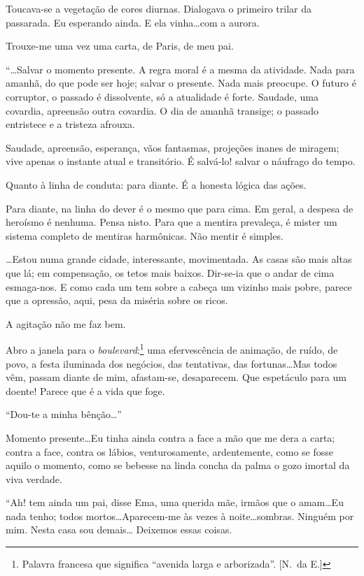 Toucava{}-se a vegetação de cores diurnas. Dialogava o primeiro trilar da passarada.
Eu esperando ainda. E ela vinha\ldots com a aurora. 

Trouxe{}-me uma vez uma carta, de Paris, de meu pai. 

``\ldots Salvar o momento presente. A regra moral é a
mesma da atividade. Nada para amanhã, do que pode ser hoje; salvar o
presente. Nada mais preocupe. O futuro é corruptor, o passado é
dissolvente, só a atualidade é forte. Saudade, uma covardia, apreensão
outra covardia. O dia de amanhã transige; o passado entristece e a
tristeza afrouxa. 

Saudade, apreensão, esperança, vãos fantasmas,
projeções inanes de miragem; vive apenas o instante atual e
transitório. É salvá{}-lo! salvar o náufrago do tempo. 

Quanto à linha de conduta: para diante. É a honesta lógica das ações. 

Para diante, na
linha do dever é o mesmo que para cima. Em geral, a despesa de heroísmo
é nenhuma. Pensa nisto. Para que a mentira prevaleça, é mister um
sistema completo de mentiras harmônicas. Não mentir é simples. 

\ldots Estou numa grande cidade, interessante, movimentada. As casas são mais 
altas que lá; em compensação, os tetos mais baixos. Dir{}-se{}-ia que o andar
de cima esmaga{}-nos. E como cada um tem sobre a cabeça um vizinho mais
pobre, parece que a opressão, aqui, pesa da miséria sobre os ricos. 

A agitação não me faz bem. 

Abro a janela para o \textit{boulevard}:\footnote{ Palavra francesa que significa 
``avenida larga e arborizada''. [N.~da E.]} uma
efervescência de animação, de ruído, de povo, a festa iluminada dos
negócios, das tentativas, das fortunas\ldots Mas todos vêm, passam diante
de mim, afastam{}-se, desaparecem. Que espetáculo para um doente!
Parece que é a vida que foge. 

``Dou{}-te a minha bênção\ldots'' 

Momento presente\ldots Eu tinha ainda contra a face a mão que me dera a carta;
contra a face, contra os lábios, venturosamente, ardentemente, como se
fosse aquilo o momento, como se bebesse na linda concha da palma o gozo
imortal da viva verdade. 

``Ah! tem ainda um pai, disse Ema, uma querida
mãe, irmãos que o amam\ldots Eu nada tenho; todos mortos\ldots Aparecem{}-me
às vezes à noite\ldots sombras. Ninguém por mim. Nesta casa sou demais\ldots
Deixemos essas coisas. 

